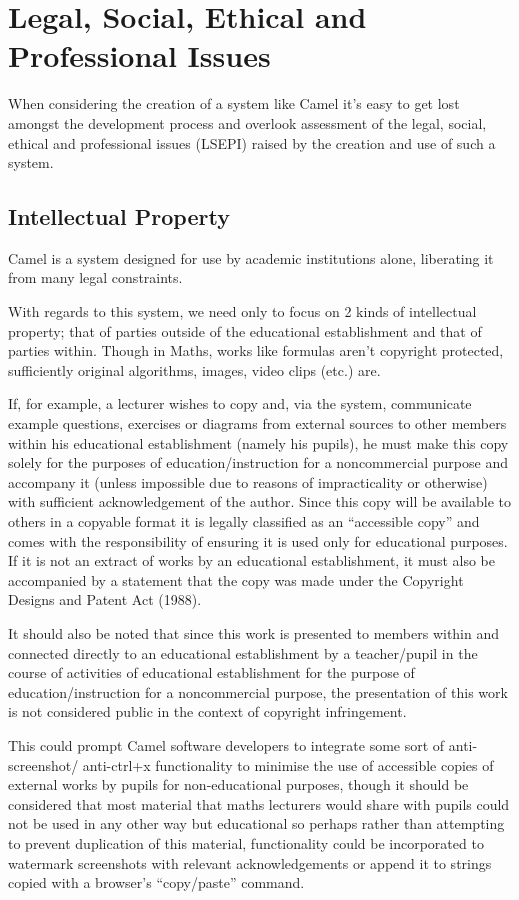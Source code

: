 \section{Legal, Social, Ethical and Professional Issues }
    When considering the creation of a system like Camel it’s easy to get lost amongst the development process and overlook assessment of the legal, social, ethical and professional issues (LSEPI) raised by the creation and use of such a system.
    
    \subsection*{Intellectual Property}
    Camel is a system designed for use by academic institutions alone, liberating it from many legal constraints.
        
    With regards to this system, we need only to focus on 2 kinds of intellectual property; that of parties outside of the educational establishment and that of parties within. Though in Maths, works like formulas aren't copyright protected, sufficiently original algorithms, images, video clips (etc.) are.

    If, for example, a lecturer wishes to copy and, via the system, communicate example questions, exercises or diagrams from external sources to other members within his educational establishment (namely his pupils), he must make this copy solely for the purposes of education/instruction for a noncommercial purpose and accompany it (unless impossible due to reasons of impracticality or otherwise) with sufficient acknowledgement of the author. Since this copy will be available to others in a copyable format it is legally classified as an “accessible copy” and comes with the responsibility of ensuring it is used only for educational purposes. If it is not an extract of works by an educational establishment, it must also be accompanied by a statement that the copy was made under the Copyright Designs and Patent Act (1988).\cite{CDaPA}

    It should also be noted that since this work is presented to members within and connected directly to an educational establishment by a teacher/pupil in the course of activities of educational establishment for the purpose of education/instruction for a noncommercial purpose, the presentation of this work is not considered public in the context of copyright infringement.

    This could prompt Camel software developers to integrate some sort of anti-screenshot/ anti-ctrl+x functionality to minimise the use of accessible copies of external works by pupils for non-educational purposes, though it should be considered that most material that maths lecturers would share with pupils could not be used in any other way but educational so perhaps rather than attempting to prevent duplication of this material, functionality could be incorporated to watermark screenshots with relevant acknowledgements or append it to strings copied with a browser’s “copy/paste” command.


